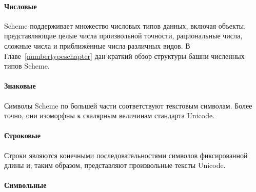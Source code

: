\paragraph{Числовые}

Scheme поддерживает множество числовых типов данных, включая
объекты, представляющие целые числа произвольной точности, рациональные числа, сложные числа и
приближённые числа различных видов. В Главе~\ref{numbertypeschapter} дан краткий обзор структуры
башни численных типов Scheme.

\paragraph{Знаковые}

Символы Scheme по большей части соответствуют текстовым символам. Более точно,
они изоморфны к скалярным величинам стандарта Unicode.

\paragraph{Строковые}

Строки являются конечными последовательностями символов фиксированной длины и,
таким образом, представляют произвольные тексты Unicode.

\newpage

\paragraph{Символьные}

